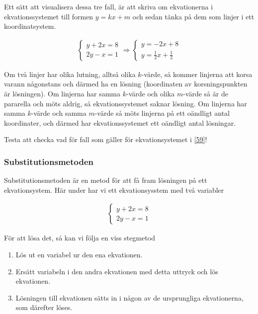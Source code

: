 Ett sätt att visualisera dessa tre fall, är att skriva om ekvationerna i ekvationssystemet till formen $y=kx+m$ och sedan tänka på dem som linjer i ett koordinatsystem.

\begin{align}
	\begin{cases}
		y+2x=8 \\
		2y-x = 1
	\end{cases} \Rightarrow 
	\begin{cases}
		y=-2x+8 \\
		y = \frac{1}{2}x+\frac{1}{2}
	\end{cases}
\end{align}

Om två linjer har olika lutning, alltså olika $k$-värde, så kommer linjerna att korsa varann någonstans och därmed ha en lösning (koordinaten av korsningspunkten är lösningen). Om linjerna har samma $k$-värde och olika $m$-värde så är de pararella och möts aldrig, så ekvationssystemet saknar lösning. Om linjerna har samma $k$-värde och samma $m$-värde så möts linjerna på ett oändligt antal koordinater, och därmed har ekvationssystemet ett oändligt antal lösningar. 

Testa att checka vad för fall som gäller för ekvationsystemet i \eqref{59}!

\subsubsection{Substitutionsmetoden}
\label{Substitutionsmetoden}

Substitutionsmetoden är en metod för att få fram lösningen på ett ekvationsystem. Här under har vi ett ekvationsysstem med två variabler

\begin{align}
	\begin{cases}
		y+2x=8 \\
		2y-x = 1
	\end{cases}
\end{align}

För att lösa det, så kan vi följa en viss stegmetod

\begin{enumerate}
	\item Lös ut en variabel ur den ena ekvationen.
	\item Ersätt variabeln i den andra ekvationen med detta uttryck och lös ekvationen.
	\item Lösningen till ekvationen sätts in i någon av de ursprungliga ekvationerna, som därefter löses.
\end{enumerate}

